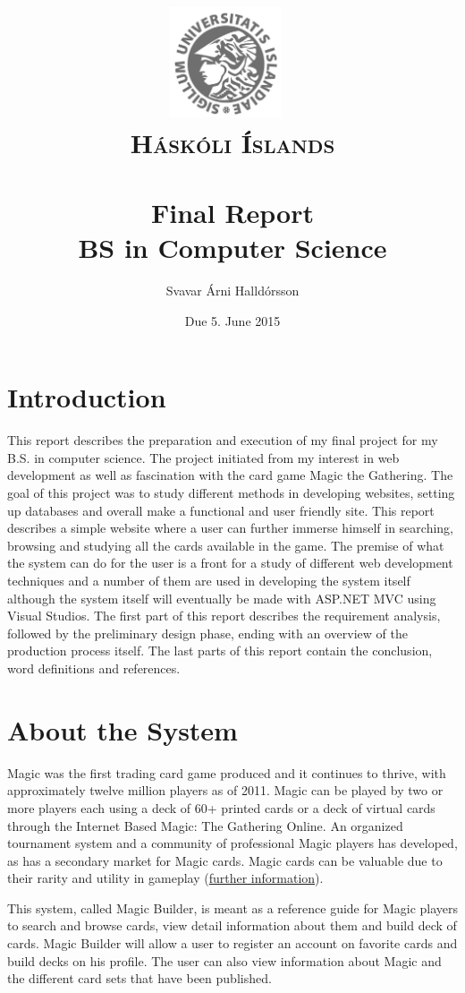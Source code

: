 \documentclass[paper=a4, fontsize=11pt]{scrartcl} %
\title{ 
\normalfont \normalsize 
\includegraphics[width=0.25\textwidth]{logo.jpg}~\\[1cm]
\textsc{Háskóli Íslands} \\ [25pt] %
\horrule{0.5pt} \\[0.4cm] %
\huge {Final Report \\ BS in Computer Science} %
\horrule{2pt} \\[0.5cm] %
}
\author{Svavar Árni Halldórsson} %
\date{\normalsize Due 5. June 2015} %
\numberwithin{equation}{section} %
\numberwithin{figure}{section} %
\numberwithin{table}{section} %
\begin{document}
\maketitle
\clearpage

\hypersetup {
  linkcolor = black
}
\tableofcontents
\hypersetup {
  linkcolor = ForestGreen,
  urlcolor = ForestGreen
}
\clearpage
\section{Introduction}
This report describes the preparation and execution of my final project for my B.S. in computer science. The project initiated from my interest in web development as well as fascination with the card game Magic the Gathering. The goal of this project was to study different methods in developing websites, setting up databases and overall make a functional and user friendly site. This report describes a simple website where a user can further immerse himself in searching, browsing and studying all the cards available in the game. The premise of what the system can do for the user is a front for a study of different web development techniques and a number of them are used in developing the system itself although the system itself will eventually be made with ASP.NET MVC using Visual Studios. The first part of this report describes the requirement analysis, followed by the preliminary design phase, ending with an overview of the production process itself. The last parts of this report contain the conclusion, word definitions and references.

\section{About the System}
Magic was the first trading card game produced and it continues to thrive, with approximately twelve million players as of 2011. Magic can be played by two or more players each using a deck of 60+ printed cards or a deck of virtual cards through the Internet Based Magic: The Gathering Online. An organized tournament system and a community of professional Magic players has developed, as has a secondary market for Magic cards. Magic cards can be valuable due to their rarity and utility in gameplay (\href{http://en.wikipedia.org/wiki/Magic:_The_Gathering}{further information}).
  
This system, called Magic Builder, is meant as a reference guide for Magic players to search and browse cards, view detail information about them and build deck of cards. Magic Builder will allow a user to register an account on favorite cards and build decks on his profile. The user can also view information about Magic and the different card sets that have been published.
\end{document}
